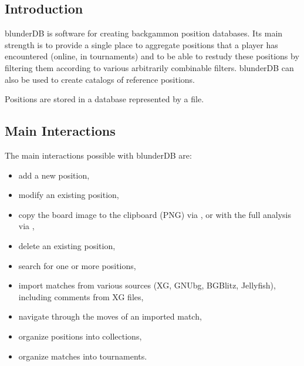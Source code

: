 \documentclass[letterpaper,10pt,english]{sphinxmanual}
\begin{document}
\subsection{Introduction}
\label{\detokenize{manuel:introduction}}
\sphinxAtStartPar
blunderDB is software for creating backgammon position databases. Its main strength is to provide a single place to aggregate positions that a player has encountered (online, in tournaments) and to be able to re\sphinxhyphen{}study these positions by filtering them according to various arbitrarily combinable filters. blunderDB can also be used to create catalogs of reference positions.

\sphinxAtStartPar
Positions are stored in a database represented by a  file.


\subsection{Main Interactions}
\label{\detokenize{manuel:interactions-principales}}
\sphinxAtStartPar
The main interactions possible with blunderDB are:
\begin{itemize}
\item {} 
\sphinxAtStartPar
add a new position,

\item {} 
\sphinxAtStartPar
modify an existing position,

\item {} 
\sphinxAtStartPar
copy the board image to the clipboard (PNG) via , or with the full analysis via ,

\item {} 
\sphinxAtStartPar
delete an existing position,

\item {} 
\sphinxAtStartPar
search for one or more positions,

\item {} 
\sphinxAtStartPar
import matches from various sources (XG, GNUbg, BGBlitz, Jellyfish), including comments from XG files,

\item {} 
\sphinxAtStartPar
navigate through the moves of an imported match,

\item {} 
\sphinxAtStartPar
organize positions into collections,

\item {} 
\sphinxAtStartPar
organize matches into tournaments.

\end{itemize}
\end{document}
